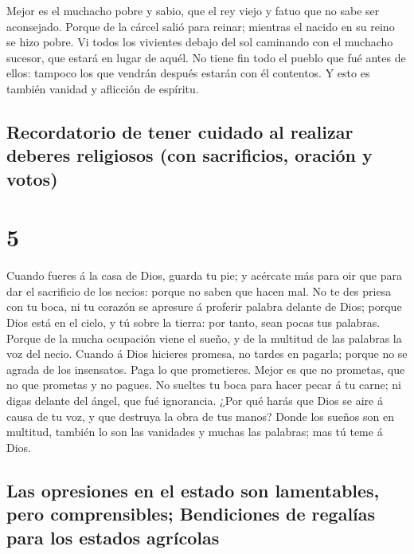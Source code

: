  Mejor es el muchacho pobre y sabio, que el rey viejo y
fatuo que no sabe ser aconsejado.  Porque de la cárcel
salió para reinar; mientras el nacido en su reino se hizo pobre.
 Vi todos los vivientes debajo del sol caminando con el
muchacho sucesor, que estará en lugar de aquél.  No tiene
fin todo el pueblo que fué antes de ellos: tampoco los que vendrán
después estarán con él contentos. Y esto es también vanidad y aflicción
de espíritu.

\hypertarget{recordatorio-de-tener-cuidado-al-realizar-deberes-religiosos-con-sacrificios-oraciuxf3n-y-votos}{%
\subsection{Recordatorio de tener cuidado al realizar deberes religiosos
(con sacrificios, oración y
votos)}\label{recordatorio-de-tener-cuidado-al-realizar-deberes-religiosos-con-sacrificios-oraciuxf3n-y-votos}}

\hypertarget{section-4}{%
\section{5}\label{section-4}}

 Cuando fueres á la casa de Dios, guarda tu pie; y
acércate más para oir que para dar el sacrificio de los necios: porque
no saben que hacen mal.  No te des priesa con tu boca, ni
tu corazón se apresure á proferir palabra delante de Dios; porque Dios
está en el cielo, y tú sobre la tierra: por tanto, sean pocas tus
palabras.  Porque de la mucha ocupación viene el sueño, y
de la multitud de las palabras la voz del necio.  Cuando á
Dios hicieres promesa, no tardes en pagarla; porque no se agrada de los
insensatos. Paga lo que prometieres.  Mejor es que no
prometas, que no que prometas y no pagues.  No sueltes tu
boca para hacer pecar á tu carne; ni digas delante del ángel, que fué
ignorancia. ¿Por qué harás que Dios se aire á causa de tu voz, y que
destruya la obra de tus manos?  Donde los sueños son en
multitud, también lo son las vanidades y muchas las palabras; mas tú
teme á Dios.

\hypertarget{las-opresiones-en-el-estado-son-lamentables-pero-comprensibles-bendiciones-de-regaluxedas-para-los-estados-agruxedcolas}{%
\subsection{Las opresiones en el estado son lamentables, pero
comprensibles; Bendiciones de regalías para los estados
agrícolas}\label{las-opresiones-en-el-estado-son-lamentables-pero-comprensibles-bendiciones-de-regaluxedas-para-los-estados-agruxedcolas}}

